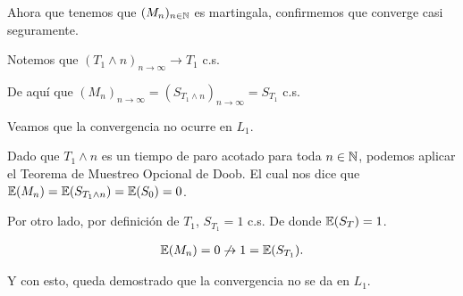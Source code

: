 	Ahora que tenemos que $(M_n)_{n \in \mathbb{N}}$ es martingala, confirmemos que converge casi seguramente.\par\null
	
	Notemos que $(T_1 \wedge n)_{n \rightarrow \infty} \rightarrow T_1$ c.s.\par\null
	
	De aquí que $(M_n)_{n \rightarrow \infty} = (S_{T_1 \wedge n})_{n \rightarrow \infty} = S_{T_1}$ c.s.\par\null				
	
	Veamos que la convergencia no ocurre en $L_1$.\par\null
				
	Dado que $T_1 \wedge n$ es un tiempo de paro acotado para toda $n \in \mathbb{N}$,
	podemos aplicar el Teorema de Muestreo Opcional de 	Doob. 
	El cual nos dice que $\mathbb{E}(M_n) = \mathbb{E}(S_{T_1 \wedge n}) = \mathbb{E}(S_0) = 0$.\par\null
	
	Por otro lado, por definición de $T_1$, $S_{T_1} = 1$ c.s.	De donde $\mathbb{E}(S_T) = 1$.
	
	\begin{align}
		\mathbb{E}(M_n) = 0 \not\rightarrow 1 = \mathbb{E}(S_{T_1}).
	\end{align}\par\null			
	
	Y con esto, queda demostrado que la convergencia no se da en $L_1$.	
